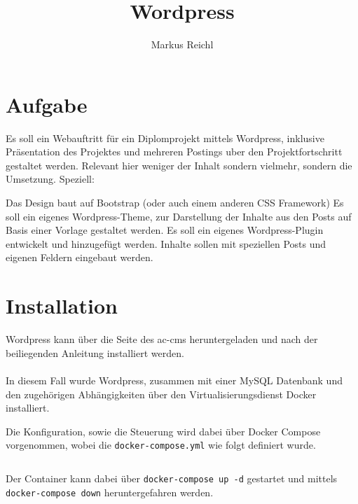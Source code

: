 \documentclass{school}
\title{Wordpress}
\author{Markus Reichl}
\begin{document}
\maketitle
\thispagestyle{fancy}	%

\tableofcontents

\section{Aufgabe}
Es soll ein Webauftritt für ein Diplomprojekt mittels Wordpress, inklusive Präsentation des Projektes und mehreren Postings uber den Projektfortschritt gestaltet werden.
Relevant hier weniger der Inhalt sondern vielmehr, sondern die Umsetzung. Speziell:
\begin{outline}
\1 Das Design baut auf Bootstrap (oder auch einem anderen CSS Framework)
\1 Es soll ein eigenes Wordpress-Theme, zur Darstellung der Inhalte aus den Posts auf Basis einer Vorlage gestaltet werden.
\1 Es soll ein eigenes Wordpress-Plugin entwickelt und hinzugefügt werden.
\1 Inhalte sollen mit speziellen Posts und eigenen Feldern eingebaut werden.
\end{outline}

\newpage
\section{Installation}
Wordpress\cite{wp} kann über die Seite\cite{wp-dl} des \gls{ac-cms} heruntergeladen und nach der beiliegenden Anleitung\cite{wp-help} installiert werden.
\\\\
In diesem Fall wurde Wordpress, zusammen mit einer MySQL\cite{mysql} Datenbank und den zugehörigen Abhängigkeiten über den Virtualisierungsdienst Docker\cite{docker} installiert.

Die Konfiguration, sowie die Steuerung wird dabei über Docker Compose\cite{docker-compose} vorgenommen, wobei die \texttt{docker-compose.yml} wie folgt definiert wurde.

\inputminted{yaml}{docker-compose.yml}

Der Container kann dabei über \texttt{docker-compose up -d} gestartet und mittels \texttt{docker-compose down} heruntergefahren werden.

\section{}

\end{document}
